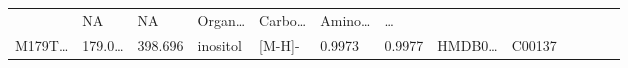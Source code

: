 \documentclass[
]{article}
\begin{document}
\begin{longtable}[]{@{}lllllllllllll@{}}
\begin{minipage}[t]{0.07\columnwidth}
\end{minipage} & \begin{minipage}[t]{0.05\columnwidth}\raggedright
NA\strut
\end{minipage} & \begin{minipage}[t]{0.04\columnwidth}\raggedright
NA\strut
\end{minipage} & \begin{minipage}[t]{0.05\columnwidth}\raggedright
Organ\ldots{}\strut
\end{minipage} & \begin{minipage}[t]{0.05\columnwidth}\raggedright
Carbo\ldots{}\strut
\end{minipage} & \begin{minipage}[t]{0.05\columnwidth}\raggedright
Amino\ldots{}\strut
\end{minipage} & \begin{minipage}[t]{0.02\columnwidth}\raggedright
\ldots{}\strut
\end{minipage}\tabularnewline
\begin{minipage}[t]{0.05\columnwidth}\raggedright
M179T\ldots{}\strut
\end{minipage} & \begin{minipage}[t]{0.05\columnwidth}\raggedright
179.0\ldots{}\strut
\end{minipage} & \begin{minipage}[t]{0.05\columnwidth}\raggedright
398.696\strut
\end{minipage} & \begin{minipage}[t]{0.05\columnwidth}\raggedright
inositol\strut
\end{minipage} & \begin{minipage}[t]{0.05\columnwidth}\raggedright
{[}M-H{]}-\strut
\end{minipage} & \begin{minipage}[t]{0.07\columnwidth}\raggedright
0.9973\strut
\end{minipage} & \begin{minipage}[t]{0.07\columnwidth}\raggedright
0.9977\strut
\end{minipage} & \begin{minipage}[t]{0.05\columnwidth}\raggedright
HMDB0\ldots{}\strut
\end{minipage} & \begin{minipage}[t]{0.04\columnwidth}\raggedright
C00137\strut
\end{minipage} & \begin{minipage}[t]{0.05\columnwidth}\raggedright

\end{minipage}
\end{longtable}
\end{document}
